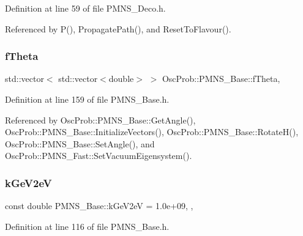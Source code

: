 Definition at line 59 of file P\+M\+N\+S\+\_\+\+Deco.\+h.



Referenced by P(), Propagate\+Path(), and Reset\+To\+Flavour().

\mbox{\label{classOscProb_1_1PMNS__Base_a1976887cd658dd86b2336c181f1470b4}} 
\subsubsection{\texorpdfstring{f\+Theta}{fTheta}}
{\footnotesize\ttfamily std\+::vector$<$ std\+::vector$<$double$>$ $>$ Osc\+Prob\+::\+P\+M\+N\+S\+\_\+\+Base\+::f\+Theta\hspace{0.3cm}{\ttfamily [protected]}, {\ttfamily [inherited]}}



Definition at line 159 of file P\+M\+N\+S\+\_\+\+Base.\+h.



Referenced by Osc\+Prob\+::\+P\+M\+N\+S\+\_\+\+Base\+::\+Get\+Angle(), Osc\+Prob\+::\+P\+M\+N\+S\+\_\+\+Base\+::\+Initialize\+Vectors(), Osc\+Prob\+::\+P\+M\+N\+S\+\_\+\+Base\+::\+Rotate\+H(), Osc\+Prob\+::\+P\+M\+N\+S\+\_\+\+Base\+::\+Set\+Angle(), and Osc\+Prob\+::\+P\+M\+N\+S\+\_\+\+Fast\+::\+Set\+Vacuum\+Eigensystem().

\mbox{\label{classOscProb_1_1PMNS__Base_ad36a0a6bf58d6ec093d3947784bd89e9}} 
\subsubsection{\texorpdfstring{k\+Ge\+V2eV}{kGeV2eV}}
{\footnotesize\ttfamily const double P\+M\+N\+S\+\_\+\+Base\+::k\+Ge\+V2eV = 1.\+0e+09\hspace{0.3cm}{\ttfamily [static]}, {\ttfamily [protected]}, {\ttfamily [inherited]}}



Definition at line 116 of file P\+M\+N\+S\+\_\+\+Base.\+h.



